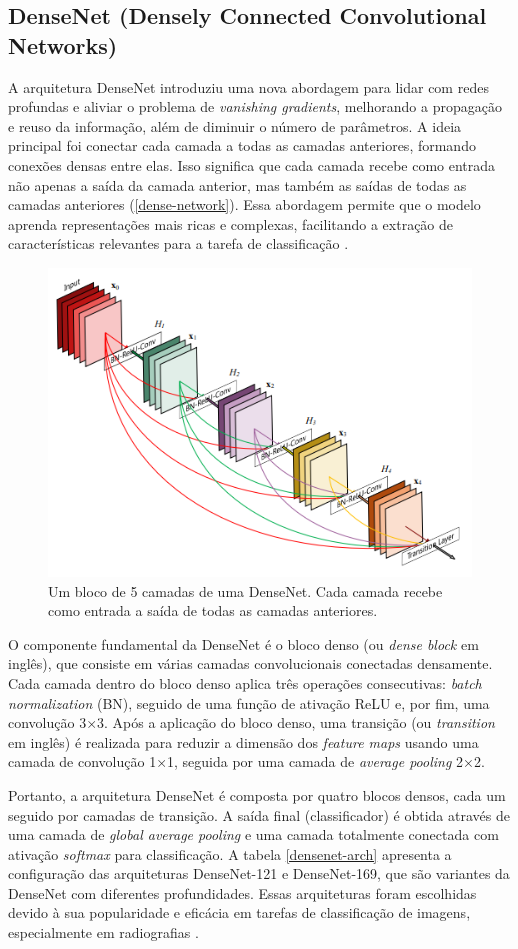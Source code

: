 \subsection{DenseNet (Densely Connected Convolutional Networks)}

A arquitetura DenseNet introduziu uma nova abordagem para lidar com redes profundas e aliviar o problema de \textit{vanishing gradients}, melhorando a propagação e reuso da informação, além de diminuir o número de parâmetros. A ideia principal foi conectar cada camada a todas as camadas anteriores, formando conexões densas entre elas. Isso significa que cada camada recebe como entrada não apenas a saída da camada anterior, mas também as saídas de todas as camadas anteriores (\autoref{dense-network}). Essa abordagem permite que o modelo aprenda representações mais ricas e complexas, facilitando a extração de características relevantes para a tarefa de classificação \citep{Huang2017}.

\begin{figure}[h]
    \centering
    \includegraphics[width=0.5\linewidth]{figs/dense-network.png}
    \caption{Um bloco de 5 camadas de uma DenseNet. Cada camada recebe como entrada a saída de todas as camadas anteriores.}
    \label{dense-network}
\end{figure}

O componente fundamental da DenseNet é o bloco denso (ou \textit{dense block} em inglês), que consiste em várias camadas convolucionais conectadas densamente. Cada camada dentro do bloco denso aplica três operações consecutivas: \textit{batch normalization} (BN), seguido de uma função de ativação ReLU e, por fim, uma convolução 3×3. Após a aplicação do bloco denso, uma transição (ou \textit{transition} em inglês) é realizada para reduzir a dimensão dos \textit{feature maps} usando uma camada de convolução 1×1, seguida por uma camada de \textit{average pooling} 2×2.

Portanto, a arquitetura DenseNet é composta por quatro blocos densos, cada um seguido por camadas de transição. A saída final (classificador) é obtida através de uma camada de \textit{global average pooling} e uma camada totalmente conectada com ativação \textit{softmax} para classificação. A tabela \ref{densenet-arch} apresenta a configuração das arquiteturas DenseNet-121 e DenseNet-169, que são variantes da DenseNet com diferentes profundidades. Essas arquiteturas foram escolhidas devido à sua popularidade e eficácia em tarefas de classificação de imagens, especialmente em radiografias \citep{Leung2020}.

